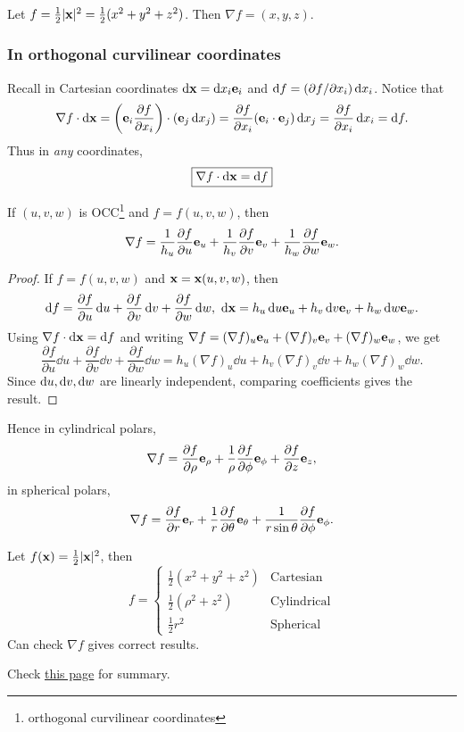 \begin{example}
    Let $ f=\frac{1}{2}|{\bf x}|^2 = \frac{1}{2}(x^2+y^2+z^2) $. Then $ \nabla f = (x,y,z) $.
\end{example}

\subsubsection*{In orthogonal curvilinear coordinates}
Recall in Cartesian coordinates $ \mathrm{d} {\bf x} = \mathrm{d} x_i {\bf e}_i $ and $ \mathrm{d} f = (\partial f/\partial x_i )\,\mathrm{d} x_i $. Notice that
\[
    \nabla f \cdot \mathrm{d} {\bf x} = \left( {\bf e}_i \frac{\partial f}{\partial x_i}  \right) \cdot \left( {\bf e}_j \,\mathrm{d} x_j \right) = \frac{\partial f}{\partial x_i}({\bf e}_i\cdot {\bf e}_j) \,\mathrm{d} x_j = \frac{\partial f}{\partial x_i}\,\mathrm{d} x_i = \mathrm{d} f.  
\]
Thus in \textit{any} coordinates, 
\[
    \boxed{\nabla f\cdot \mathrm{d} {\bf x} = \mathrm{d} f}
\] 

\begin{proposition}\label{prop:2.1}
    If $ (u,v,w) $ is OCC\footnote{orthogonal curvilinear coordinates} and $f=f(u,v,w)$, then 
    \[
        \nabla f = \frac{1}{h_u}\frac{\partial f}{\partial u}{\bf e}_u + \frac{1}{h_v}\frac{\partial f}{\partial v}{\bf e}_v + \frac{1}{h_w}\frac{\partial f}{\partial w}{\bf e}_w.
    \] 
\end{proposition}
\begin{proof}
    If $ f=f(u,v,w) $ and $ {\bf x} = {\bf x}(u,v,w) $, then 
    \[
        \mathrm{d} f = \frac{\partial f}{\partial u}\,\mathrm{d} u +\frac{\partial f}{\partial v}\,\mathrm{d} v +\frac{\partial f}{\partial w}\,\mathrm{d} w,\ \mathrm{d} {\bf x} = h_u\,\mathrm{d} u{\bf e}_u+h_v\,\mathrm{d} v{\bf e}_v+h_w\,\mathrm{d} w{\bf e}_w.
    \]
    Using $\nabla f\cdot \mathrm{d} {\bf x} = \mathrm{d} f$ and writing $ \nabla f = (\nabla f)_u{\bf e}_u+(\nabla f)_v{\bf e}_v+(\nabla f)_w{\bf e}_w $, we get 
    \[
        \frac{\partial f}{\partial u}\dd u +\frac{\partial f}{\partial v}\dd v +\frac{\partial f}{\partial w}\dd w = h_u(\nabla f)_u \dd u+h_v(\nabla f)_v \dd v+h_w(\nabla f)_w \dd w.
    \]
    Since $ \mathrm{d} u, \mathrm{d} v,\mathrm{d} w $ are linearly independent, comparing coefficients gives the result.
\end{proof}

Hence in cylindrical polars,
\[
    \nabla f = \frac{\partial f}{\partial \rho}{\bf e}_\rho+\frac{1}{\rho} \frac{\partial f}{\partial \phi}{\bf e}_\phi+\frac{\partial f}{\partial z}{\bf e}_z,  
\]
in spherical polars,
\[
    \nabla f = \frac{\partial f}{\partial r}{\bf e}_r+\frac{1}{r}\frac{\partial f}{\partial \theta}{\bf e}_\theta+\frac{1}{r\sin\theta}\frac{\partial f}{\partial \phi}{\bf e}_\phi.   
\]
\begin{example}
    Let $ f({\bf x})= \frac{1}{2}|{\bf x}|^2 $, then 
    \[
        f = \begin{cases}
        \frac{1}{2}(x^2+y^2+z^2) &\text{Cartesian}\\
        \frac{1}{2}(\rho^2+z^2) &\text{Cylindrical}\\
        \frac{1}{2}r^2 &\text{Spherical}
        \end{cases} 
    \]
    Can check $ \nabla f $ gives correct results.
\end{example}
Check \href{https://www.vle.cam.ac.uk/pluginfile.php/19798882/mod_resource/content/2/vc_notes1.pdf#page=17}{this page} for summary.